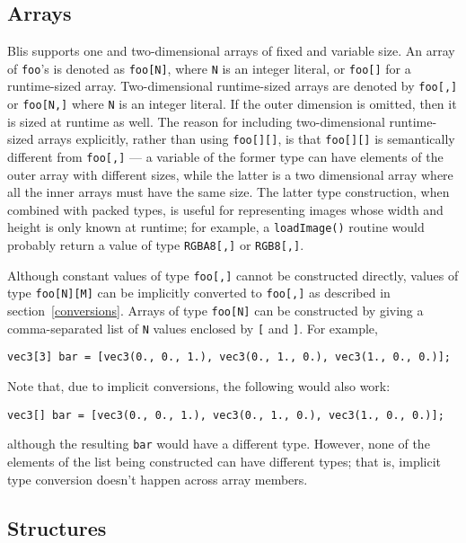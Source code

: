 \documentclass[11pt]{article}
\newcommand{\code}[1]{\texttt{#1}}
\begin{document}
\subsection{Arrays}

Blis supports one and two-dimensional arrays of fixed and variable size. An array of \code{foo}'s is denoted as \code{foo[N]}, where \code{N} is an integer literal, or \code{foo[]} for a runtime-sized array. Two-dimensional runtime-sized arrays are denoted by \code{foo[,]} or \code{foo[N,]} where \code{N} is an integer literal. If the outer dimension is omitted, then it is sized at runtime as well. The reason for including two-dimensional runtime-sized arrays explicitly, rather than using \code{foo[][]}, is that \code{foo[][]} is semantically different from \code{foo[,]} --- a variable of the former type can have elements of the outer array with different sizes, while the latter is a two dimensional array where all the inner arrays must have the same size. The latter type construction, when combined with packed types, is useful for representing images whose width and height is only known at runtime; for example, a \code{loadImage()} routine would probably return a value of type \code{RGBA8[,]} or \code{RGB8[,]}.

Although constant values of type \code{foo[,]} cannot be constructed directly, values of type \code{foo[N][M]} can be implicitly converted to \code{foo[,]} as described in section~\ref{conversions}. Arrays of type \code{foo[N]} can be constructed by giving a comma-separated list of \code{N} values enclosed by \code{[} and \code{]}. For example,

\begin{lstlisting}
vec3[3] bar = [vec3(0., 0., 1.), vec3(0., 1., 0.), vec3(1., 0., 0.)];
\end{lstlisting}

Note that, due to implicit conversions, the following would also work:

\begin{lstlisting}
vec3[] bar = [vec3(0., 0., 1.), vec3(0., 1., 0.), vec3(1., 0., 0.)];
\end{lstlisting}

although the resulting \code{bar} would have a different type. However, none of the elements of the list being constructed can have different types; that is, implicit type conversion doesn't happen across array members.

\subsection{Structures}
\end{document}
